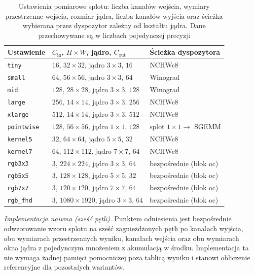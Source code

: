 \documentclass[a4paper,12pt]{book} %
\begin{document}
\begin{table}[t!]
\centering
\caption{Ustawienia pomiarowe splotu: liczba kanałów wejścia, wymiary przestrzenne wejścia, rozmiar jądra, liczba kanałów wyjścia oraz ścieżka wybierana przez dyspozytor zależny od kształtu jądra. Dane przechowywane są w liczbach pojedynczej precyzji}
\label{tab:conv-presety}
\small
\setlength{\tabcolsep}{4pt}
\begin{tabular}{p{} p{} p{}}
\hline
Ustawienie & $C_{\mathrm{in}}$, $H \times W$, jądro, $C_{\mathrm{out}}$ & Ścieżka dyspozytora \\
\hline
\texttt{tiny}      & $16$,  $32 \times 32$,   jądro $3 \times 3$, $16$  & NCHWc8 \\
\texttt{small}     & $64$,  $56 \times 56$,   jądro $3 \times 3$, $64$  & Winograd \\
\texttt{mid}       & $128$, $28 \times 28$,   jądro $3 \times 3$, $128$ & Winograd \\
\texttt{large}     & $256$, $14 \times 14$,   jądro $3 \times 3$, $256$ & NCHWc8 \\
\texttt{xlarge}    & $512$, $14 \times 14$,   jądro $3 \times 3$, $512$ & NCHWc8 \\
\texttt{pointwise} & $128$, $56 \times 56$,   jądro $1 \times 1$, $128$ & splot $1 \times 1 \to$ SGEMM \\
\texttt{kernel5}   & $32$,  $64 \times 64$,   jądro $5 \times 5$, $32$  & NCHWc8 \\
\texttt{kernel7}   & $64$,  $112 \times 112$, jądro $7 \times 7$, $64$  & NCHWc8 \\
\texttt{rgb3x3}    & $3$,   $224 \times 224$,  jądro $3 \times 3$, $64$  & bezpośrednie (blok oc) \\
\texttt{rgb5x5}    & $3$,   $128 \times 128$,  jądro $5 \times 5$, $32$  & bezpośrednie (blok oc) \\
\texttt{rgb7x7}    & $3$,   $120 \times 120$,  jądro $7 \times 7$, $64$  & bezpośrednie (blok oc) \\
\texttt{rgb\_fhd}  & $3$,   $1080 \times 1920$, jądro $3 \times 3$, $64$ & bezpośrednie (blok oc) \\
\hline
\end{tabular}
\end{table}

\emph{Implementacja naiwna (sześć pętli).} Punktem odniesienia jest bezpośrednie odwzorowanie wzoru splotu na sześć zagnieżdżonych pętli po kanałach wyjścia, obu wymiarach przestrzennych wyniku, kanałach wejścia oraz obu wymiarach okna jądra z pojedynczym mnożeniem z akumulacją w środku. Implementacja ta nie wymaga żadnej pamięci pomocniczej poza tablicą wyniku i stanowi obliczenie referencyjne dla pozostałych wariantów.
\end{document}
